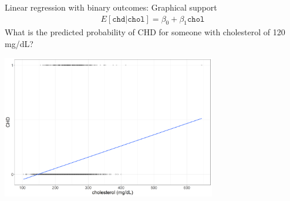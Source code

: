 \documentclass[10pt,t]{beamer}
\begin{document}
\begin{frame}{Linear regression with binary outcomes: Graphical support}
	\vspace{-1cm}
	\begin{align*} 
		E[\texttt{chd}|\texttt{chol}] = \beta_0 + \beta_1 \texttt{chol}  
	\end{align*}
	What is the predicted probability of CHD for someone with cholesterol of 120 mg/dL?
	
	\begin{center}
		\includegraphics[width=0.7\textwidth]{./figs/scatter_lm}
	\end{center}
\end{frame}
\end{document}
